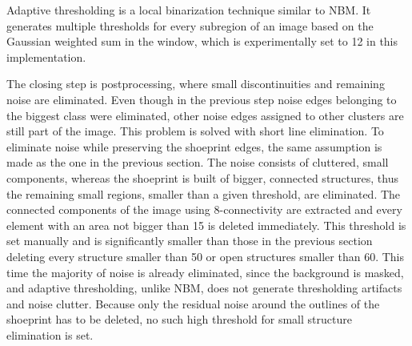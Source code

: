 \documentclass[draft,final]{vutinfth} %
\begin{document}
Adaptive thresholding is a local binarization technique similar to NBM.
It generates multiple thresholds for every subregion of an image based on the Gaussian weighted sum in the window, which is experimentally set to 12 in this implementation.
\par
The closing step is postprocessing, where small discontinuities and remaining noise are eliminated.
Even though in the previous step noise edges belonging to the biggest class were eliminated, other noise edges assigned to other clusters are still part of the image.
This problem is solved with short line elimination.
To eliminate noise while preserving the shoeprint edges, the same assumption is made as the one in the previous section.
The noise consists of cluttered, small components, whereas the shoeprint is built of bigger, connected structures, thus the remaining small regions, smaller than a given threshold, are eliminated.
The connected components of the image using 8-connectivity are extracted and every element with an area not bigger than 15 is deleted immediately.
This threshold is set manually and is significantly smaller than those in the previous section deleting every structure smaller than 50 or open structures smaller than 60.
This time the majority of noise is already eliminated, since the background is masked, and adaptive thresholding, unlike NBM, does not generate thresholding artifacts and noise clutter.
Because only the residual noise around the outlines of the shoeprint has to be deleted, no such high threshold for small structure elimination is set.
\end{document}
